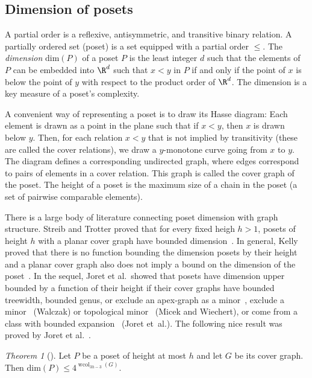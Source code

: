 \documentclass[1p,number,a4paper]{elsarticle}
\theoremstyle{remark}
\renewcommand{\dim}{\mathrm{dim}}
\DeclareMathOperator{\wcol}{wcol}
\newtheorem{theorem}{Theorem}[section]
\begin{document}

\subsection{Dimension of posets}

A partial order is a reflexive, antisymmetric, and transitive binary relation. 
A partially ordered set (poset) is a set equipped with a partial order $\leq$. 
The \emph{dimension} $\dim(P)$ of a poset $P$ is the least integer $d$ such that the elements of $P$ can be embedded into $\R^d$ such that $x<y$ in $P$ if and only if the point of $x$ is below the point of $y$ with respect to the product order of $\R^d$. 
The dimension is a key measure of a poset’s complexity.

A convenient way of representing a poset is to draw its Hasse diagram: 
Each element is drawn as a point in the plane such that if $x<y$, then $x$ is drawn below $y$. Then, for each relation $x<y$ that is not implied by transitivity (these are called the cover relations), we draw a $y$-monotone curve going from $x$ to $y$. 
The diagram defines a corresponding undirected graph, where edges correspond to pairs
of elements in a cover relation. 
This graph is called the cover graph of the poset. 
The height of a poset is the maximum size of a chain in the poset (a set of pairwise
comparable elements).

There is a large body of literature connecting poset dimension with graph structure. Streib and Trotter proved that for every fixed heigh $h>1$, posets of height $h$ with a planar cover graph have bounded dimension~\cite{streib2014dimension}. 
In general, Kelly proved that there is no function bounding the dimension posets by their height and a planar cover graph also does not imply a bound on the dimension of the poset~\cite{Kelly81}. 
In the sequel, Joret et al.\ showed that posets have dimension upper bounded by a function of their height if their cover graphs have bounded treewidth, bounded genus, or exclude an apex-graph 
as a minor~\cite{JoretMMTWW16}, exclude a minor~\cite{walczak2017minors} (Walczak) or topological minor~\cite{micek2017topological} (Micek and Wiechert), or come from a class with bounded expansion~\cite{joret2018sparsity} (Joret et~al.). 
The following nice result was proved by Joret et al.~\cite{joret2019nowhere}. 

\begin{theorem}[\cite{joret2019nowhere}]
    Let $P$ be a poset of height at most $h$ and let $G$ be its cover graph. Then $\dim(P)\leq 4^{\wcol_{3h-3}(G)}$. 
\end{theorem}
\end{document}
